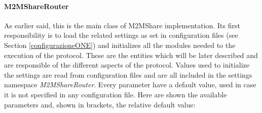 \paragraph{M2MShareRouter}
As earlier said, this is the main class of M2MShare implementation. Its first responsibility is to load the related settings as set in configuration files (see Section \ref{configurazioneONE}) and initializes all the modules needed to the execution of the protocol. These are the entities which will be later described and are responsible of the different aspects of the protocol. Values used to initialize the settings are read from configuration files and are all included in the settings namespace \textit{M2MShareRouter}. Every parameter have a default value, used in case it is not specified in any configuration file. Here are shown the available parameters and, shown in brackets, the relative default value:
